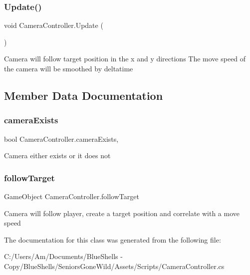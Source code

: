 \subsubsection{\texorpdfstring{Update()}{Update()}}
{\footnotesize\ttfamily void Camera\+Controller.\+Update (\begin{DoxyParamCaption}{ }\end{DoxyParamCaption})\hspace{0.3cm}{\ttfamily [private]}}



Camera will follow target position in the x and y directions The move speed of the camera will be smoothed by deltatime 



\subsection{Member Data Documentation}
\mbox{\label{class_camera_controller_a2569b5df8af02ceb1c47be482616b638}} 
\subsubsection{\texorpdfstring{camera\+Exists}{cameraExists}}
{\footnotesize\ttfamily bool Camera\+Controller.\+camera\+Exists\hspace{0.3cm}{\ttfamily [static]}, {\ttfamily [private]}}



Camera either exists or it does not 

\mbox{\label{class_camera_controller_a1bfdfa348a7f9bb2c8d511d9ee3435b9}} 
\subsubsection{\texorpdfstring{follow\+Target}{followTarget}}
{\footnotesize\ttfamily Game\+Object Camera\+Controller.\+follow\+Target}



Camera will follow player, create a target position and correlate with a move speed 



The documentation for this class was generated from the following file\+:\begin{DoxyCompactItemize}
\item 
C\+:/\+Users/\+Am/\+Documents/\+Blue\+Shells -\/ Copy/\+Blue\+Shells/\+Seniors\+Gone\+Wild/\+Assets/\+Scripts/Camera\+Controller.\+cs\end{DoxyCompactItemize}

